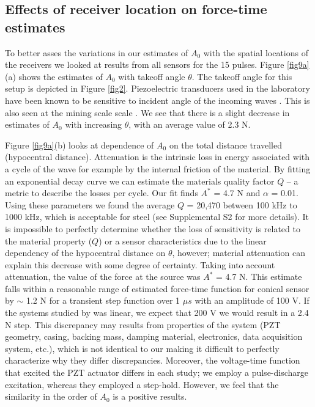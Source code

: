 \documentclass[preprint,3p, 11pt,authoryear]{elsarticle}
\begin{document}
{\subsection{Effects of receiver location on force-time estimates}

To better asses the variations in our estimates of $A_{0}$ with the spatial locations of the receivers we looked at results from all sensors for the 15 pulses. Figure \ref{fig9a}(a) shows the estimates of $A_{0}$ with takeoff angle $\theta$. The takeoff angle for this setup is depicted in Figure \ref{fig2}.  Piezoelectric transducers used in the laboratory have been known to be sensitive to incident angle of the incoming waves \citep{Goodfellow2015}.  This is also seen at the mining scale scale \citep{Kwaitek2011}. We see that there is a slight decrease in estimates of $A_{0}$ with increasing  $\theta$, with an average value of 2.3 N.  

Figure \ref{fig9a}(b) looks at dependence of $A_{0}$ on the total distance travelled (hypocentral distance).  Attenuation is the intrinsic loss in energy associated with a cycle of the wave for example by the internal friction of the material.  By fitting an exponential decay curve we can estimate the materials quality factor $Q$ -- a metric to describe the losses per cycle.  Our fit finds $A^{*}$ = 4.7 N and $\alpha$ = 0.01. Using these parameters we found the average $Q$ = 20,470 between 100 kHz to 1000 kHz, which is acceptable for steel (see Supplemental S2 for more details). It is impossible to perfectly determine whether the loss of sensitivity is related to the material property ($Q$) or a sensor characteristics due to the linear dependency of the hypocentral distance on $\theta$, however; material attenuation can explain this decrease with some degree of certainty. Taking into account attenuation, the value of the force at the source was $A^{*}$ = 4.7 N. This estimate falls within a reasonable range of estimated force-time function for conical sensor by \citet{Breckenridge1990} $\sim $ 1.2 N for a transient step function over 1 $\mu s$ with an amplitude of 100 V. If the systems studied by \citet{Breckenridge1990} was linear, we expect that 200 V we would result in a 2.4 N step.  This discrepancy may results from properties of the system (PZT geometry, casing, backing mass, damping material, electronics, data acquisition system, etc.), which is not identical to our making it difficult to perfectly characterize why they differ discrepancies. Moreover, the voltage-time function that excited the PZT actuator differs in each study; we employ a pulse-discharge excitation, whereas they employed a step-hold. However, we feel that the similarity in the order of $A_{0}$ is a positive results. 

}
\end{document}
